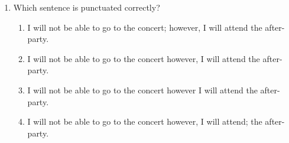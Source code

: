 \documentclass[12pt]{article}
\begin{document}
\begin{enumerate}
\vspace{0.5cm}

\item Which sentence is punctuated correctly?
\begin{enumerate}[label=\Alph*.]
    \item I will not be able to go to the concert; however, I will attend the after-party.
    \item I will not be able to go to the concert however, I will attend the after-party.
    \item I will not be able to go to the concert however I will attend the after-party.
    \item I will not be able to go to the concert however, I will attend; the after-party.
\end{enumerate}

\end{enumerate}
\end{document}
